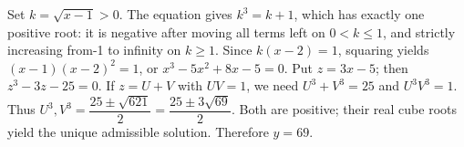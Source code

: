 Set $k=\sqrt{x-1}>0$. The equation gives $k^3=k+1$, which has exactly one positive root: it is negative after moving all terms left on $0<k\le1$, and strictly increasing from-1 to infinity on $k\ge1$. Since $k(x-2)=1$, squaring yields $(x-1)(x-2)^2=1$, or $x^3-5x^2+8x-5=0$. Put $z=3x-5$; then $z^3-3z-25=0$. If $z=U+V$ with $UV=1$, we need $U^3+V^3=25$ and $U^3V^3=1$. Thus $U^3,V^3=\dfrac{25\pm\sqrt{621}}{2}=\dfrac{25\pm3\sqrt{69}}{2}$. Both are positive; their real cube roots yield the unique admissible solution. Therefore $\boxed{y=69}$.
